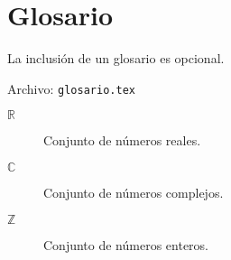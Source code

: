 
\chapter*{Glosario}

La inclusión de un glosario es opcional.

Archivo: \texttt{glosario.tex}

\begin{description} 
  \item[$\mathbb{R}$] Conjunto de números reales.

  \item[$\mathbb{C}$] Conjunto de números complejos.

  \item[$\mathbb{Z}$] Conjunto de números enteros.
\end{description}
\endinput
